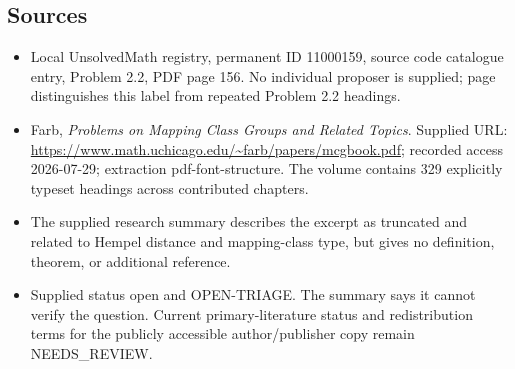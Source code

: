 \documentclass[11pt]{article}
\begin{document}
\subsection{Sources}
\begin{itemize}
\item Local UnsolvedMath registry, permanent ID 11000159, source code catalogue entry, Problem 2.2, PDF page 156. No individual proposer is supplied; page distinguishes this label from repeated Problem 2.2 headings.
\item Farb, \emph{Problems on Mapping Class Groups and Related Topics}. Supplied URL: \url{https://www.math.uchicago.edu/~farb/papers/mcgbook.pdf}; recorded access 2026-07-29; extraction pdf-font-structure. The volume contains 329 explicitly typeset headings across contributed chapters.
\item The supplied research summary describes the excerpt as truncated and related to Hempel distance and mapping-class type, but gives no definition, theorem, or additional reference.
\item Supplied status open and OPEN-TRIAGE. The summary says it cannot verify the question. Current primary-literature status and redistribution terms for the publicly accessible author/publisher copy remain NEEDS\_REVIEW.
\end{itemize}
\end{document}
